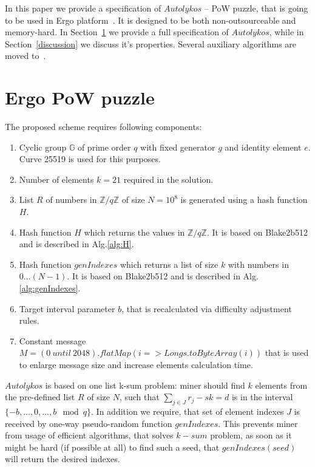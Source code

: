 \documentclass[]{article}
\newcommand{\Name}{$Autolykos$}
\begin{document}
    In this paper we provide a specification of \Name{} -- PoW puzzle, that is
    going to be used in Ergo platform~\cite{ergo}. It is designed to be both
    non-outsourceable and memory-hard. In Section~\ref{puzzle} we provide a full
    specification of \Name, while in Section~\ref{discussion} we discuss it's
    properties. Several auxiliary algorithms are moved to~.

    \section{Ergo PoW puzzle}
    \label{puzzle}

    The proposed scheme requires following components:
    \begin{enumerate}
        \item Cyclic group $\mathbb{G}$ of prime order $q$ with fixed generator $g$
        and identity element $e$.
        Curve 25519 is used for this purposes.
        \item Number of elements $k=21$ required in the solution.
        \item List $R$ of numbers in $\mathbb{Z}/q\mathbb{Z}$ of size $N=10^{8}$ is generated
        using a hash function $H$.
        \item Hash function $H$ which returns the values in $\mathbb{Z}/q\mathbb{Z}$.
        It is based on Blake2b512 and is described in Alg.\ref{alg:H}.
        \item Hash function $genIndexes$ which returns a list of size $k$ with numbers in $0\dots (N-1)$.
        It is based on Blake2b512 and is described in Alg.\ref{alg:genIndexes}.
        \item Target interval parameter $b$, that is recalculated via difficulty adjustment rules.
        \item Constant message $M=(0~until~2048).flatMap(i => Longs.toByteArray(i))$ that is used to enlarge message size and increase elements calculation time.
    \end{enumerate}

    \Name{} is based on one list k-sum problem: miner should find
    $k$ elements from the pre-defined list $R$ of size $N$, such that
    $\sum_{j \in J} r_{j} - sk = d$ is in the interval $\{-b,\dots,0,\dots,b\mod q\}$.
    In addition we require, that set of element indexes $J$ is received
    by one-way pseudo-random function $genIndexes$. This prevents miner
    from usage of efficient algorithms, that solves $k-sum$ problem, as
    soon as it might be hard (if possible at all) to find such a seed,
    that $genIndexes(seed)$ will return the desired indexes.
\end{document}
